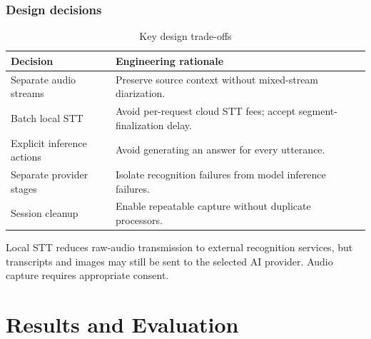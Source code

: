 \documentclass[openany]{tietreport}
\begin{document}
\subsection{Design decisions}
\begin{table}[htbp]\centering\small\begin{tabularx}{\linewidth}{@{}lX@{}}\toprule Decision & Engineering rationale \\ \midrule
Separate audio streams & Preserve source context without mixed-stream diarization. \\
Batch local STT & Avoid per-request cloud STT fees; accept segment-finalization delay. \\
Explicit inference actions & Avoid generating an answer for every utterance. \\
Separate provider stages & Isolate recognition failures from model inference failures. \\
Session cleanup & Enable repeatable capture without duplicate processors. \\
\bottomrule\end{tabularx}\caption{Key design trade-offs}\end{table}
Local STT reduces raw-audio transmission to external recognition services, but transcripts and images may still be sent to the selected AI provider. Audio capture requires appropriate consent.
\chapter{Results and Evaluation}
\end{document}
